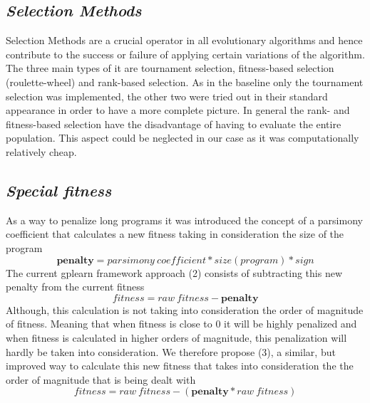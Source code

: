 \documentclass[12pt]{article}
\begin{document}
\subsection*{\textit{Selection Methods}}
Selection Methods are a crucial operator in all evolutionary algorithms and hence contribute to the success or failure of applying certain variations of the algorithm. The three main types of it are tournament selection, fitness-based selection (roulette-wheel) and rank-based selection. As in the baseline only the tournament selection was implemented, the other two were tried out in their standard appearance in order to have a more complete picture. In general the rank- and fitness-based selection have the disadvantage of having to evaluate the entire population. This aspect could be neglected in our case as it was computationally relatively cheap.

\subsection*{\textit{Special fitness}}
As a way to penalize long programs it was introduced the concept of a parsimony coefficient that calculates a new fitness taking in consideration the size of the program
\begin{equation}\mathbf{penalty} = parsimony\ coefficient * size(program) * sign \end{equation}
The current gplearn framework approach (2) consists of subtracting this new penalty from the current fitness
\begin{equation} fitness = raw\ fitness - \mathbf{penalty} \end{equation}
Although, this calculation is not taking into consideration the order of magnitude of fitness. Meaning that when fitness is close to 0 it will be highly penalized and when fitness is calculated in higher orders of magnitude, this penalization will hardly be taken into consideration.\vspace{5mm}
We therefore propose (3), a similar, but improved way to calculate this new fitness that takes into consideration the the order of magnitude that is being dealt with
\begin{equation}fitness = raw\ fitness - (\mathbf{penalty} * raw\ fitness) \end{equation}
\end{document}
